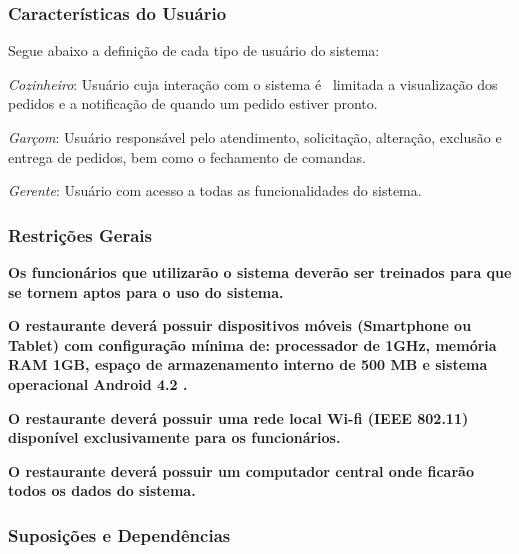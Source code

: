 \subsubsection[Características do Usuário]{\textcolor[rgb]{0.078431375,0.09411765,0.13725491}{Características do
Usuário}}
{
Segue abaixo a definição de cada tipo de usuário do sistema:}

{
\textit{Cozinheiro}: Usuário cuja interação com o sistema é \ limitada a visualização dos pedidos e a notificação de
quando um pedido estiver pronto.}

{
\textit{Garçom}: Usuário responsável pelo atendimento, solicitação, alteração, exclusão e entrega de pedidos, bem como o
fechamento de comandas.}

{
\textit{Gerente}: Usuário com acesso a todas as funcionalidades do sistema.}

\subsubsection[Restrições Gerais \ ]{\textcolor[rgb]{0.078431375,0.09411765,0.13725491}{Restrições Gerais \ }}
{
\textbf{\textcolor[rgb]{0.5019608,0.0,0.0}{Os funcionários que utilizarão o sistema deverão ser treinados para que se
tornem aptos para o uso do sistema.}}}

{
\textbf{\textcolor[rgb]{0.5019608,0.0,0.0}{O restaurante deverá possuir dispositivos móveis (Smartphone ou Tablet) com
configuração mínima de: processador de 1GHz, memória RAM 1GB, espaço de armazenamento interno de 500 MB e sistema
operacional Android 4.2 .}}}

{
\textbf{\textcolor[rgb]{0.5019608,0.0,0.0}{O restaurante deverá possuir uma rede local Wi-fi (IEEE 802.11) disponível
exclusivamente para os funcionários.}}}

{
\textbf{\textcolor[rgb]{0.5019608,0.0,0.0}{O restaurante deverá possuir um computador central onde ficarão todos os
dados do sistema.}}}


\bigskip

{
\subsubsection{\textcolor[rgb]{0.078431375,0.09411765,0.13725491}{Suposições e Dependências}}}

